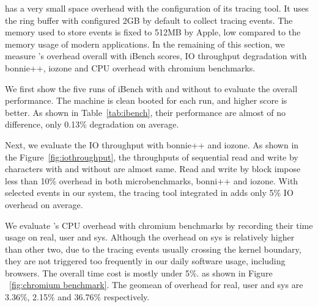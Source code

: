 \xxx has a very small space overhead with the configuration of its tracing
tool. It uses the ring buffer with configured 2GB by default to collect tracing
events. The memory used to store events is fixed to 512MB by Apple, 
low compared to the memory usage of modern applications. In the remaining
of this section, we measure \xxx's overhead overall with iBench scores, IO
throughput degradation with bonnie++, iozone and CPU overhead with chromium
benchmarks.


We first show the five runs of iBench with and without \xxx to evaluate the
overall performance. The machine is clean booted for each run, and higher
score is better. As shown in Table~\ref{tab:ibench}, their
performance are almost of no difference, only 0.13\% degradation on average.


Next, we evaluate the IO throughput with bonnie++ and iozone. As shown in the
Figure~\ref{fig:iothroughput}, the throughputs of sequential read and write
by characters with and without \xxx are almost same. Read and write by block
impose less than 10\% overhead in  both microbenchmarks, bonni++ and iozone.
With selected events in our system, the tracing tool integrated in \xxx
adds only 5\% IO overhead on average.


We evaluate \xxx's CPU overhead with chromium benchmarks by recording their
time usage on real, user and sys. Although the overhead on sys is relatively
higher than other two, due to the tracing events usually crossing the
kernel boundary, they are not triggered too frequently in our daily software
usage, including browsers. The overall time cost is mostly under 5\%.
as shown in Figure ~\ref{fig:chromium
benchmark}. The geomean of overhead for real, user and sys are 3.36\%, 2.15\% and 36.76\%
respectively.
